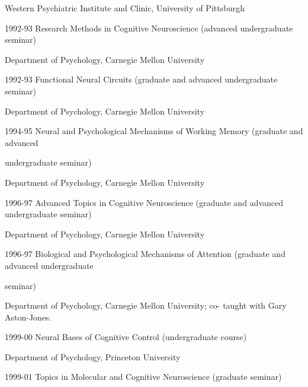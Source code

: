 \documentclass[10 pt]{article}
\begin{document}
\hspace{0.81in} Western Psychiatric Institute and Clinic, University of Pittsburgh
    \smallskip

1992-93 \hspace{0.3in} Research Methods in Cognitive Neuroscience (advanced undergraduate seminar)

\hspace{0.81in} Department of Psychology, Carnegie Mellon University
    \smallskip

1992-93 \hspace{0.3in} Functional Neural Circuits (graduate and advanced undergraduate seminar)

\hspace{0.81in} Department of Psychology, Carnegie Mellon University
    \smallskip

1994-95 \hspace{0.3in} Neural and Psychological Mechanisms of Working Memory (graduate and advanced

\hspace{0.81in} undergraduate seminar)

\hspace{0.81in} Department of Psychology, Carnegie Mellon University
    \smallskip

1996-97 \hspace{0.3in} Advanced Topics in Cognitive Neuroscience (graduate and advanced undergraduate seminar)

\hspace{0.81in} Department of Psychology, Carnegie Mellon University
    \smallskip

1996-97 \hspace{0.3in} Biological and Psychological Mechanisms of Attention (graduate and advanced undergraduate

\hspace{0.81in} seminar)

\hspace{0.81in} Department of Psychology, Carnegie Mellon University; co-
taught with Gary Aston-Jones.
    \smallskip

1999-00 \hspace{0.3in} Neural Bases of Cognitive Control (undergraduate course)

\hspace{0.81in} Department of Psychology, Princeton University
    \smallskip

1999-01 \hspace{0.3in} Topics in Molecular and Cognitive Neuroscience (graduate seminar)
\end{document}
